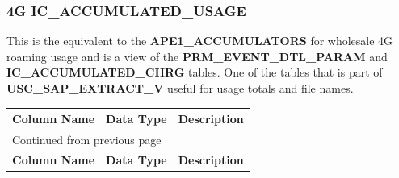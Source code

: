 \documentclass[12pt,twoside]{article}
\begin{document}
\subsubsection{4G IC\_ACCUMULATED\_USAGE}
\label{sec:orgheadline74}
 This is the equivalent to the \textbf{APE1\_ACCUMULATORS} for wholesale 4G roaming usage and
is a view of the \textbf{PRM\_EVENT\_DTL\_PARAM} and \textbf{IC\_ACCUMULATED\_CHRG} tables.
 One of the tables that is part of \textbf{USC\_SAP\_EXTRACT\_V} useful for usage totals and
 file names. 
\footnotesize

\begin{longtable}{l|l|l}
\hline
\textbf{Column Name} & \textbf{Data Type} & \textbf{Description}\\
\hline
\endfirsthead
\multicolumn{3}{l}{Continued from previous page} \\
\hline

\textbf{Column Name} & \textbf{Data Type} & \textbf{Description} \\


\end{longtable}
\end{document}
